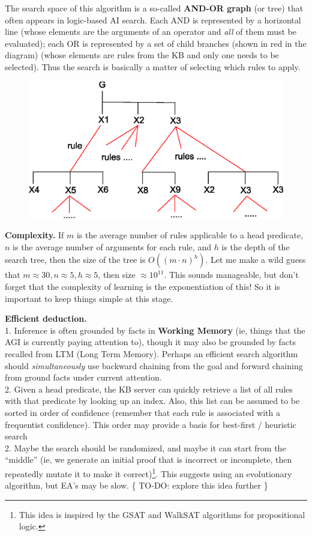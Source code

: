 \documentclass[a4paper]{report}
\begin{document}
The search space of this algorithm is a so-called \textbf{AND-OR graph} (or tree) that often appears in logic-based AI search.  Each AND is represented by a horizontal line (whose elements are the arguments of an operator and \textit{all} of them must be evaluated);  each OR is represented by a set of child branches (shown in red in the diagram) (whose elements are rules from the KB and only one needs to be selected).  Thus the search is basically a matter of selecting which rules to apply.
\begin{figure}[H]
\centering
\includegraphics[scale=0.8]{and-or-graph.eps}
\end{figure}

\textbf{Complexity.}  If $m$ is the average number of rules applicable to a head predicate, $n$ is the average number of arguments for each rule, and $h$ is the depth of the search tree, then the size of the tree is $O((m \cdot n)^h)$.  Let me make a wild guess that $m \approx 30, n \approx 5, h \approx 5$, then size $\approx 10^{11}$.  This sounds manageable, but don't forget that the complexity of learning is the exponentiation of this!  So it is important to keep things simple at this stage.

\textbf{Efficient deduction.}\\
1.  Inference is often grounded by facts in \textbf{Working Memory} (ie, things that the AGI is currently paying attention to), though it may also be grounded by facts recalled from LTM (Long Term Memory).  Perhaps an efficient search algorithm should \textit{simultaneously} use backward chaining from the goal and forward chaining from ground facts under current attention.\\
2.  Given a head predicate, the KB server can quickly retrieve a list of all rules with that predicate by looking up an index.  Also, this list can be assumed to be sorted in order of confidence (remember that each rule is associated with a frequentist confidence).  This order may provide a basis for best-first / heuristic search\\
2.  Maybe the search should be randomized, and maybe it can start from the ``middle'' (ie, we generate an initial proof that is incorrect or incomplete, then repeatedly mutate it to make it correct)\footnote{This idea is inspired by the GSAT and WalkSAT algorithms for propositional logic.}.  This suggests using an evolutionary algorithm, but EA's may be slow. \{ TO-DO:  explore this idea further \}
\end{document}
